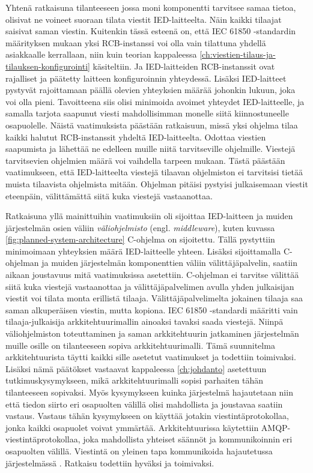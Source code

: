 Yhtenä ratkaisuna tilanteeseen jossa moni komponentti tarvitsee samaa tietoa, olisivat ne voineet suoraan tilata viestit IED-laitteelta. Näin kaikki tilaajat saisivat saman viestin. Kuitenkin tässä esteenä on, että IEC 61850 -standardin määrityksen mukaan yksi RCB-instanssi voi olla vain tilattuna yhdellä asiakkaalle kerrallaan, niin kuin teorian kappaleessa \ref{ch:viestien-tilaus-ja-tilauksen-konfigurointi} käsiteltiin. Ja IED-laitteiden RCB-instanssit ovat rajalliset ja päätetty laitteen konfiguroinnin yhteydessä. Lisäksi IED-laitteet pystyvät rajoittamaan päällä olevien yhteyksien määrää johonkin lukuun, joka voi olla pieni. Tavoitteena siis olisi minimoida avoimet yhteydet IED-laitteelle, ja samalla tarjota saapunut viesti mahdollisimman monelle siitä kiinnostuneelle osapuolelle. Näistä vaatimuksista päästään ratkaisuun, missä yksi ohjelma tilaa kaikki halutut RCB-instanssit yhdeltä IED-laitteelta. Odottaa viestien saapumista ja lähettää ne edelleen muille niitä tarvitseville ohjelmille. Viestejä tarvitsevien ohjelmien määrä voi vaihdella tarpeen mukaan. Tästä päästään vaatimukseen, että IED-laitteelta viestejä tilaavan ohjelmiston ei tarvitsisi tietää muista tilaavista ohjelmista mitään. Ohjelman pitäisi pystyisi julkaisemaan viestit eteenpäin, välittämättä siitä kuka viestejä vastaanottaa.

Ratkaisuna yllä mainittuihin vaatimuksiin oli sijoittaa IED-laitteen ja muiden järjestelmän osien väliin \emph{väliohjelmisto} (engl. \emph{middleware}), kuten kuvassa \ref{fig:planned-system-architecture} C-ohjelma on sijoitettu. Tällä pystyttiin minimoimaan yhteyksien määrä IED-laitteelle yhteen. Lisäksi sijoittamalla C-ohjelman ja muiden järjestelmän komponenttien väliin välittäjäpalvelin, saatiin aikaan joustavuus mitä vaatimuksissa asetettiin. C-ohjelman ei tarvitse välittää siitä kuka viestejä vastaanottaa ja välittäjäpalvelimen avulla yhden julkaisijan viestit voi tilata monta erillistä tilaaja. Välittäjäpalvelimelta jokainen tilaaja saa saman alkuperäisen viestin, mutta kopiona. IEC 61850 -standardi määritti vain tilaaja-julkaisija arkkitehtuurimallin ainoaksi tavaksi saada viestejä. Niinpä väliohjelmiston toteuttaminen ja saman arkkitehtuurin jatkaminen järjestelmän muille osille on tilanteeseen sopiva arkkitehtuurimalli. Tämä suunnitelma arkkitehtuurista täytti kaikki sille asetetut vaatimukset ja todettiin toimivaksi. Lisäksi nämä päätökset vastaavat kappaleessa \ref{ch:johdanto} asetettuun tutkimuskysymykseen, mikä arkkitehtuurimalli sopisi parhaiten tähän tilanteeseen sopivaksi. Myös kysymykseen kuinka järjestelmä hajautetaan niin että tiedon siirto eri osapuolten välillä olisi mahdollista ja joustavaa saatiin vastaus. Vastaus tähän kysymykseen on käyttää jotakin viestintäprotokollaa, jonka kaikki osapuolet voivat ymmärtää. Arkkitehtuurissa käytettiin AMQP-viestintäprotokollaa, joka mahdollista yhteiset säännöt ja kommunikoinnin eri osapuolten välillä. Viestintä on yleinen tapa kommunikoida hajautetussa järjestelmässä \mbox{\cite[s.~2]{distributed-systems-concepts-and-design}}. Ratkaisu todettiin hyväksi ja toimivaksi.

